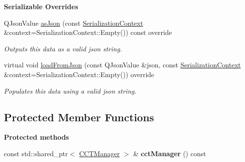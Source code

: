 \begin{Indent}\textbf{ Serializable Overrides}\par
\begin{DoxyCompactItemize}
\item 
\mbox{\label{classrev_1_1_char_control_component_a9e32d95d8a97ca5b9b77fa502a18d5b8}} 
Q\+Json\+Value \mbox{\hyperlink{classrev_1_1_char_control_component_a9e32d95d8a97ca5b9b77fa502a18d5b8}{as\+Json}} (const \mbox{\hyperlink{structrev_1_1_serialization_context}{Serialization\+Context}} \&context=Serialization\+Context\+::\+Empty()) const override
\begin{DoxyCompactList}\small\item\em Outputs this data as a valid json string. \end{DoxyCompactList}\item 
\mbox{\label{classrev_1_1_char_control_component_a8f4959d0b4a92bf578c303530eebda3b}} 
virtual void \mbox{\hyperlink{classrev_1_1_char_control_component_a8f4959d0b4a92bf578c303530eebda3b}{load\+From\+Json}} (const Q\+Json\+Value \&json, const \mbox{\hyperlink{structrev_1_1_serialization_context}{Serialization\+Context}} \&context=Serialization\+Context\+::\+Empty()) override
\begin{DoxyCompactList}\small\item\em Populates this data using a valid json string. \end{DoxyCompactList}\end{DoxyCompactItemize}
\end{Indent}
\subsection*{Protected Member Functions}
\begin{Indent}\textbf{ Protected methods}\par
\begin{DoxyCompactItemize}
\item 
\mbox{\label{classrev_1_1_char_control_component_a109e767115774fb258bef94e4bea29c6}} 
const std\+::shared\+\_\+ptr$<$ \mbox{\hyperlink{classrev_1_1_c_c_t_manager}{C\+C\+T\+Manager}} $>$ \& {\bfseries cct\+Manager} () const
\end{DoxyCompactItemize}
\end{Indent}
